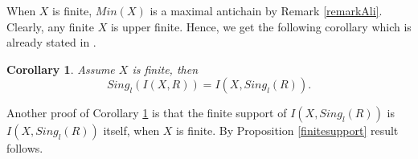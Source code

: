 \documentclass[12pt]{article}
\newtheorem{corollary}[theorem]{Corollary}
\newtheorem{lemma}[theorem]{Lemma}
\begin{document}
\medskip 

When $X$ is finite, $Min(X)$ is a maximal antichain by Remark \ref{remarkAli}. Clearly, any finite $X$ is upper finite. Hence, we get the
following corollary which is already stated in \cite[Proposition 13]{Trio:CharIncAlg}.

\begin{corollary}
\label{CorMinSingular} Assume $X$ is finite, then 
\begin{equation*}
Sing_l({I(X,R)}) = I(X,Sing_l(R)) .
\end{equation*}
\end{corollary}

Another proof of Corollary \ref{CorMinSingular} is that the finite support
of $I(X,Sing_l(R))$ is $I(X,Sing_l(R))$ itself, when $X$ is finite. By
Proposition \ref{finitesupport} result follows.

\medskip


%

\end{document}
